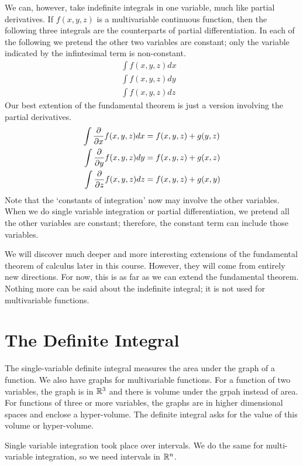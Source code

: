 \documentclass[fleqn,letterpaper]{report}
\begin{document}
We can, however, take indefinite integrals in one variable,
much like partial derivatives. If $f(x,y,z)$ is a
multivariable continuous function, then the following three
integrals are the counterparts of partial differentiation. In
each of the following we pretend the other two variables are
constant; only the variable indicated by the infintesimal term
is non-constant.
\begin{align*}
\int f(x,y,z) dx & \\
\int f(x,y,z) dy & \\
\int f(x,y,z) dz & 
\end{align*}
Our best extention of the fundamental theorem is just a
version involving the partial derivatives.
\begin{align*}
\int \frac{\partial}{\partial x} f(x,y,z) dx & = f(x,y,z) + g(y,z) \\
\int \frac{\partial}{\partial y} f(x,y,z) dy & = f(x,y,z) + g(x,z) \\
\int \frac{\partial}{\partial z} f(x,y,z) dz & = f(x,y,z) + g(x,y) 
\end{align*}
Note that the `constants of integration' now may involve the
other variables. When we do single variable integration or
partial differentiation, we pretend all the other variables
are constant; therefore, the constant term can include those
variables.

We will discover much deeper and more interesting extensions
of the fundamental theorem of calculus later in this course.
However, they will come from entirely new directions. For
now, this is as far as we can extend the fundamental theorem.
Nothing more can be said about the indefinite integral; it is
not used for multivariable functions.

\section{The Definite Integral}
\label{definite-integra}

The single-variable definite integral measures the area
under the graph of a function. We also have graphs for
multivariable functions. For a function of two variables, the
graph is in $\mathbb{R}^3$ and there is volume under the grpah
instead of area. For functions of three or more variables,
the graphs are in higher dimensional spaces and enclose a
hyper-volume. The definite integral asks for the
value of this volume or hyper-volume.

Single variable integration took place over intervals. We do
the same for multi-variable integration, so we need intervals
in $\mathbb{R}^n$.
\end{document}
